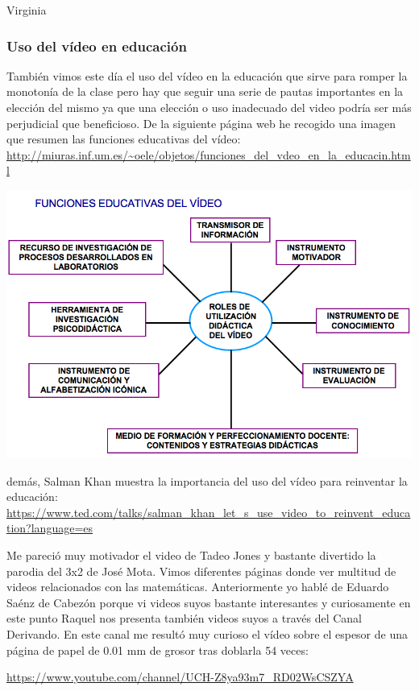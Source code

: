 \begin{opin}{\virgicolor}{Virginia}
\subsubsection{Uso del vídeo en educación}
También vimos este día el uso del vídeo en la educación que sirve para romper la monotonía de la clase pero hay que seguir una serie de pautas importantes en la elección del mismo ya que una elección o uso inadecuado del video podría ser más perjudicial que beneficioso. De la siguiente página web he recogido una imagen que resumen las funciones educativas del vídeo:
\url{http://miuras.inf.um.es/~oele/objetos/funciones_del_vdeo_en_la_educacin.html}


\begin{minipage}[hbtp]{1.0\linewidth}
	\centering
	\includegraphics[width=0.85\linewidth]{img/videoeducacion.jpg}
	\label{videoeducacion}
\end{minipage}

demás, Salman Khan muestra la importancia del uso del vídeo para reinventar la educación: \url{https://www.ted.com/talks/salman_khan_let_s_use_video_to_reinvent_education?language=es}

Me pareció muy motivador el video de Tadeo Jones y bastante divertido la parodia del 3x2 de José Mota. Vimos diferentes páginas donde ver multitud de videos relacionados con las matemáticas. Anteriormente yo hablé de Eduardo Saénz de Cabezón porque vi videos suyos bastante interesantes y curiosamente en este punto Raquel nos presenta también videos suyos a través del Canal Derivando. En este canal me resultó muy curioso el vídeo sobre el espesor de una página de papel de 0.01 mm de grosor tras doblarla 54 veces:

\url{https://www.youtube.com/channel/UCH-Z8ya93m7_RD02WsCSZYA}


\end{opin}

